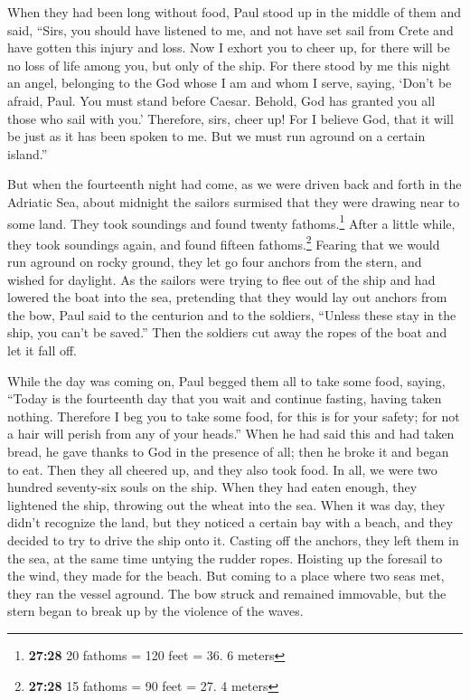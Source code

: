  When they had been long without food, Paul stood up in
the middle of them and said, ``Sirs, you should have listened to me, and
not have set sail from Crete and have gotten this injury and loss.
 Now I exhort you to cheer up, for there will be no loss
of life among you, but only of the ship.  For there stood
by me this night an angel, belonging to the God whose I am and whom I
serve,  saying, `Don't be afraid, Paul. You must stand
before Caesar. Behold, God has granted you all those who sail with you.'
 Therefore, sirs, cheer up! For I believe God, that it
will be just as it has been spoken to me.  But we must
run aground on a certain island.''

 But when the fourteenth night had come, as we were
driven back and forth in the Adriatic Sea, about midnight the sailors
surmised that they were drawing near to some land.  They
took soundings and found twenty fathoms.\footnote{\textbf{27:28} 20
  fathoms = 120 feet = 36. 6 meters} After a little while, they took
soundings again, and found fifteen fathoms.\footnote{\textbf{27:28} 15
  fathoms = 90 feet = 27. 4 meters}  Fearing that we
would run aground on rocky ground, they let go four anchors from the
stern, and wished for daylight.  As the sailors were
trying to flee out of the ship and had lowered the boat into the sea,
pretending that they would lay out anchors from the bow, 
Paul said to the centurion and to the soldiers, ``Unless these stay in
the ship, you can't be saved.''  Then the soldiers cut
away the ropes of the boat and let it fall off.

 While the day was coming on, Paul begged them all to
take some food, saying, ``Today is the fourteenth day that you wait and
continue fasting, having taken nothing.  Therefore I beg
you to take some food, for this is for your safety; for not a hair will
perish from any of your heads.''  When he had said this
and had taken bread, he gave thanks to God in the presence of all; then
he broke it and began to eat.  Then they all cheered up,
and they also took food.  In all, we were two hundred
seventy-six souls on the ship.  When they had eaten
enough, they lightened the ship, throwing out the wheat into the sea.
 When it was day, they didn't recognize the land, but
they noticed a certain bay with a beach, and they decided to try to
drive the ship onto it.  Casting off the anchors, they
left them in the sea, at the same time untying the rudder ropes.
Hoisting up the foresail to the wind, they made for the beach.
 But coming to a place where two seas met, they ran the
vessel aground. The bow struck and remained immovable, but the stern
began to break up by the violence of the waves.

